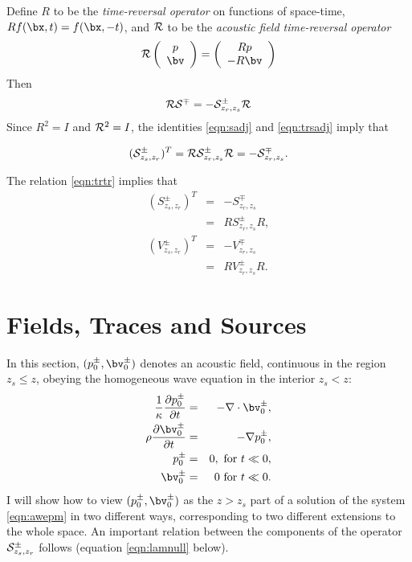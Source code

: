 Define $R$ to be the {\em time-reversal operator} on functions of
space-time, $Rf(\bx,t) = f(\bx,-t)$, and ${\cal R}$ to be the {\em
  acoustic field time-reversal operator}
\begin{equation}
  \label{eqn:trdef}
  {\cal R} \left(
    \begin{array}{c}
      p\\
      \bv
    \end{array}
  \right) =
  \left(
    \begin{array}{c}
      Rp\\
      -R\bv
    \end{array}
  \right)
\end{equation}
Then 
\begin{equation}
  \label{eqn:trsadj}
  {\cal R}{\cal S}^{\mp} = -{\cal S}^{\pm}_{z_r,z_s}{\cal R}
\end{equation}
Since $R^2 = I$ and ${\cal R}^2 = I$, the identities \ref{eqn:sadj} and \ref{eqn:trsadj} imply that

\begin{equation} 
  \label{eqn:trtr}
 ({\cal S}^{\pm}_{z_s,z_r})^T = {\cal R}{\cal S}_{z_r,z_s}^{\pm}{\cal R}=
 -{\cal S}^{\mp}_{z_r,z_s}.
\end{equation}


The relation \ref{eqn:trtr} implies that
\begin{eqnarray}
  (S^{\pm}_{z_s,z_r})^T &=& -S^{\mp}_{z_r,z_s} \nonumber\\
                        &=& R S^{\pm}_{z_r,z_s}R, \nonumber\\
    (V^{\pm}_{z_s,z_r})^T &=& -V^{\mp}_{z_r,z_s} \nonumber\\
                        &=& R V^{\pm}_{z_r,z_s}R.
                            \label{eqn:trtrcomp}
\end{eqnarray}
  
\section{Fields, Traces and Sources}
In this section, $(p^{\pm}_0,\bv^{\pm}_0)$ denotes an acoustic field,
continuous in the region $z_s \le z $, obeying the homogeneous wave
equation in the interior $z_s < z $:
\begin{eqnarray}
\label{eqn:awe1}
  \frac{1}{\kappa}\frac{\partial p^{\pm}_0}{\partial t} & = & - \nabla \cdot \bv^{\pm}_0, \nonumber \\
  \rho\frac{\partial \bv^{\pm}_0}{\partial t} & = & - \nabla
                                                    p^{\pm}_0, \nonumber \\
  p^{\pm}_0 & =& 0,  \mbox{ for } t \ll 0, \nonumber\\ 
  \bv^{\pm}_0 & = & 0 \mbox{ for } t \ll 0.
\end{eqnarray}
I will show how to view $(p^{\pm}_0,\bv^{\pm}_0)$ as the $z>z_s$ part
of a solution of the system \ref{eqn:awepm} in two different ways,
corresponding to two different extensions to the whole space. An
important relation between the components of the operator
${\cal S}^{\pm}_{z_s,z_r}$ follows (equation \ref{eqn:lamnull} below).

